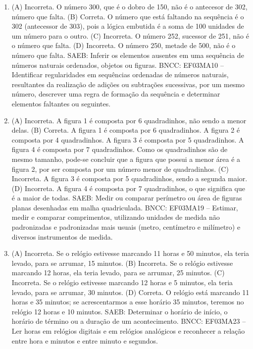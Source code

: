 \begin{enumerate}
\item
(A) Incorreta. O número 300, que é o dobro de 150, não é o antecesor de 302, número que falta.
(B) Correta. O número que está faltando na sequência é o 302 (antecessor de 303), pois a lógica embutida é a soma de 100 unidades de um número para o outro.
(C) Incorreta. O número 252, sucessor de 251, não é o número que falta.
(D) Incorreta. O número 250, metade de 500, não é o número que falta.
SAEB: Inferir os elementos ausentes em uma sequência de
números naturais ordenados, objetos ou figuras.
BNCC: EF03MA10 -- Identificar regularidades em sequências ordenadas de números naturais,
resultantes da realização de adições ou subtrações sucessivas, por um mesmo número,
descrever uma regra de formação da sequência e determinar elementos faltantes ou seguintes.

\item
(A) Incorreta. A figura 1 é composta por 6 quadradinhos, não sendo a menor delas.
(B) Correta. A figura 1 é composta por 6 quadradinhos. A figura 2 é composta por 4 quadradinhos. A figura 3 é composta por 5 quadradinhos. A figura 4 é composta por 7 quadradinhos. Como os quadradinhos são de mesmo tamanho, pode-se concluir que a figura que possui a menor área é a figura 2, por ser composta por um número menor de quadradinhos.
(C) Incorreta. A figura 3 é composta por 5 quadradinhos, sendo a segunda maior.
(D) Incorreta. A figura 4 é composta por 7 quadradinhos, o que significa que é a maior de todas.
SAEB: Medir ou comparar perímetro ou área de figuras planas desenhadas em malha quadriculada.
BNCC: EF03MA19 -- Estimar, medir e comparar comprimentos, utilizando unidades de medida
não padronizadas e padronizadas mais usuais (metro, centímetro e milímetro) e diversos
instrumentos de medida.

\item
(A) Incorreta. Se o relógio estivesse marcando 11 horas e 50 minutos, ela teria levado, para se arrumar, 15 minutos.
(B) Incorreta. Se o relógio estivesse marcando 12 horas, ela teria levado, para se arrumar, 25 minutos.
(C) Incorreta. Se o relógio estivesse marcando 12 horas e 5 minutos, ela teria levado, para se arrumar, 30 minutos.
(D) Correta. O relógio está marcando 11 horas e 35 minutos; se acrescentarmos a esse horário 35 minutos, teremos no relógio 12 horas e 10 minutos.
SAEB: Determinar o horário de início, o horário de término ou a duração de um acontecimento.
BNCC: EF03MA23 – Ler horas em relógios digitais e em relógios analógicos e reconhecer a relação
entre hora e minutos e entre minuto e segundos.


\end{enumerate}
